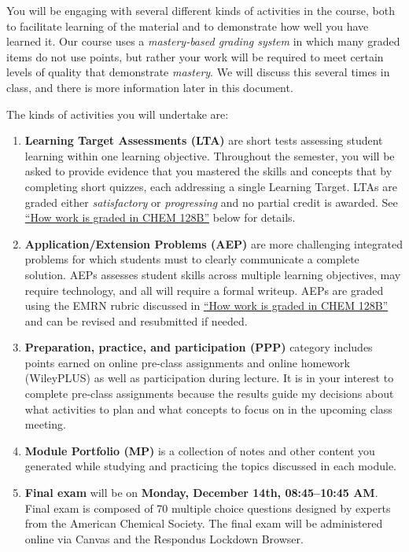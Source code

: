 You will be engaging with several different kinds of activities in the
course, both to facilitate learning of the material and to demonstrate
how well you have learned it. Our course uses a \emph{mastery-based
grading system} in which many graded items do not use points, but rather
your work will be required to meet certain levels of quality that
demonstrate \emph{mastery}. We will discuss this several times in class,
and there is more information later in this document.

The kinds of activities you will undertake are:

\begin{enumerate}
\def\labelenumi{\arabic{enumi}.}
\tightlist
\item
  \textbf{Learning Target Assessments (LTA)} are short tests assessing
  student learning within one learning objective. Throughout the
  semester, you will be asked to provide evidence that you mastered the
  skills and concepts that by completing short quizzes, each addressing
  a single Learning Target. LTAs are graded either \emph{satisfactory}
  or \emph{progressing} and no partial credit is awarded. See
  \protect\hyperlink{grading}{``How work is graded in CHEM 128B''} below
  for details.
\item
  \textbf{Application/Extension Problems (AEP)} are more challenging
  integrated problems for which students must to clearly communicate a
  complete solution. AEPs assesses student skills across multiple
  learning objectives, may require technology, and all will require a
  formal writeup. AEPs are graded using the EMRN rubric discussed in
  \protect\hyperlink{grading}{``How work is graded in CHEM 128B''} and
  can be revised and resubmitted if needed.
\item
  \textbf{Preparation, practice, and participation (PPP)} category
  includes points earned on online pre-class assignments and online
  homework (WileyPLUS) as well as participation during lecture. It is in
  your interest to complete pre-class assignments because the results
  guide my decisions about what activities to plan and what concepts to
  focus on in the upcoming class meeting.
\item
  \textbf{Module Portfolio (MP)} is a collection of notes and other
  content you generated while studying and practicing the topics
  discussed in each module.
\item
  \textbf{Final exam} will be on \textbf{Monday, December 14th,
  08:45--10:45 AM}. Final exam is composed of 70 multiple choice
  questions designed by experts from the American Chemical Society. The
  final exam will be administered online via Canvas and the Respondus
  Lockdown Browser.
\end{enumerate}


